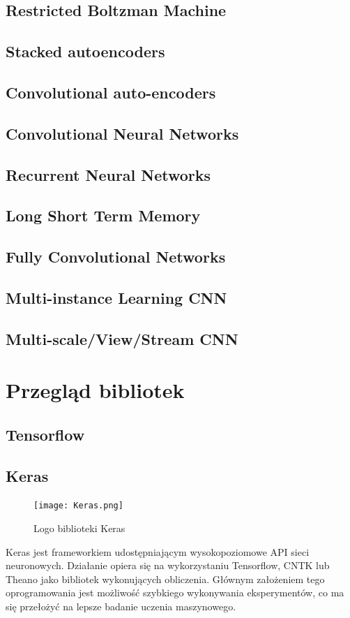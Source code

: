\documentclass[a4paper,twoside,titlepage,openright]{book}
\begin{document}
\subsection{Restricted Boltzman Machine}
\subsection{Stacked autoencoders}
\subsection{Convolutional auto-encoders}
\subsection{Convolutional Neural Networks}
\subsection{Recurrent Neural Networks}
\subsection{Long Short Term Memory}
\subsection{Fully Convolutional Networks}
\subsection{Multi-instance Learning CNN}
\subsection{Multi-scale/View/Stream CNN}

\section{Przegląd bibliotek}
\subsection{Tensorflow}

\subsection{Keras}
\begin{figure}[h]
	\centering
			\texttt{[image: Keras.png]}
		\caption{Logo biblioteki Keras}
\end{figure}
Keras jest frameworkiem udostępniającym wysokopoziomowe API sieci neuronowych. Działanie opiera się na wykorzystaniu Tensorflow, CNTK lub Theano jako bibliotek wykonujących obliczenia. Głównym założeniem tego oprogramowania jest możliwość szybkiego wykonywania eksperymentów, co ma się przełożyć na lepsze badanie uczenia maszynowego.
\end{document}
